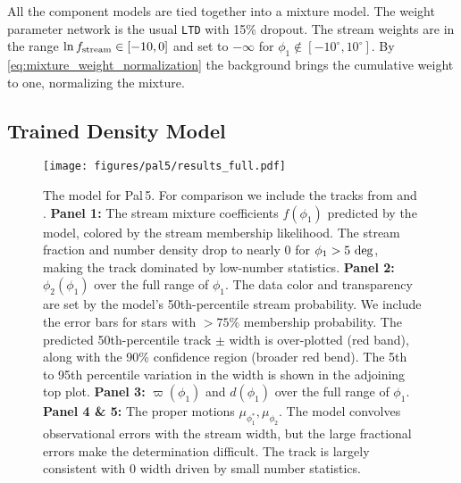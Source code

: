 \documentclass[twocolumn]{aastex631}
\newcommand{\stream}[1]{#1}
\newcommand{\parallax}{\varpi}
\begin{document}
        All the component models are tied together into a mixture model.  The
        weight parameter network is the usual \texttt{LTD} with 15\% dropout.
        The stream weights are in the range $\ln{f_{\rm stream}} \in [-10, 0]$
        and set to $-\infty$ for $\phi_1 \notin [-10^\circ, 10^\circ]$. By
        \autoref{eq:mixture_weight_normalization} the background  brings the
        cumulative weight to one, normalizing the mixture.


    \subsection{Trained Density Model} \label{sub:results_pal5:results}

        \begin{figure*}[ht]
            \centering
            \texttt{[image: figures/pal5/results\_full.pdf]}
            \caption{%
                The model for \stream{Pal\,5}.  For comparison we include the
                tracks from \citet{Price-Whelan+2019} and \citet{Ibata+2021}.
                \textbf{Panel 1: }%
                The stream mixture coefficients $f(\phi_1)$ predicted by the
                model, colored by the stream membership likelihood. The
                stream fraction and number density drop to nearly $0$ for $\phi_1 > 5 \
                \rm{deg}$, making the track dominated by low-number
                statistics.
                \textbf{Panel 2: }
                $\phi_2(\phi_1)$ over the full range of $\phi_1$. The data color
                and transparency are set by the model's 50th-percentile stream
                probability. We include the error bars for stars with $>75\%$
                membership probability. The predicted 50th-percentile track
                $\pm$ width is over-plotted (red band), along with the 90\%
                confidence region (broader red bend). The 5th to 95th percentile
                variation in the width is shown in the adjoining top plot.
                \textbf{Panel 3: }%
                $\parallax(\phi_1)$ and $d(\phi_1)$ over the full range of
                $\phi_1$.
                \textbf{Panel 4 \& 5: }%
                The proper motions $\mu_{\phi_1^*}, \mu_{\phi_2}$. The model
                convolves observational errors with the stream width, but the
                large fractional errors make the determination difficult. The
                track is largely consistent with 0 width driven by small number
                statistics.  }
            \label{fig:pal5-results-full}
        \end{figure*}
\end{document}
